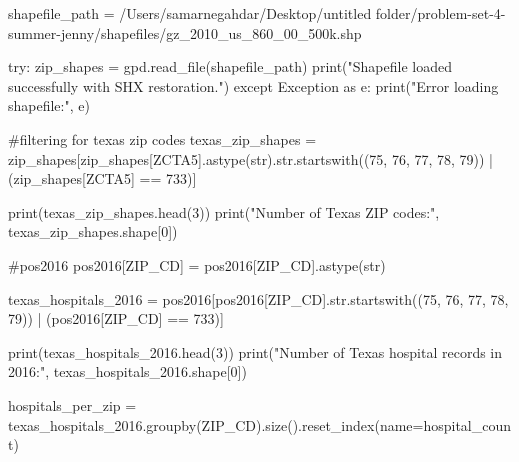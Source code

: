 \documentclass[
  letterpaper,
  DIV=11,
  numbers=noendperiod]{scrartcl}
\newenvironment{Shaded}{\begin{snugshade}}{\end{snugshade}}
\newcommand{\NormalTok}[1]{\textcolor[rgb]{0.00,0.23,0.31}{#1}}
\begin{document}
\begin{Shaded}
\begin{Highlighting}[]
\NormalTok{shapefile\_path = \textquotesingle{}/Users/samarnegahdar/Desktop/untitled folder/problem{-}set{-}4{-}summer{-}jenny/shapefiles/gz\_2010\_us\_860\_00\_500k.shp\textquotesingle{}}

\NormalTok{try:}
\NormalTok{    zip\_shapes = gpd.read\_file(shapefile\_path)}
\NormalTok{    print("Shapefile loaded successfully with SHX restoration.")}
\NormalTok{except Exception as e:}
\NormalTok{    print("Error loading shapefile:", e)}
\end{Highlighting}
\end{Shaded}

\begin{Shaded}
\begin{Highlighting}[]
\NormalTok{\#filtering for texas zip codes}
\NormalTok{texas\_zip\_shapes = zip\_shapes[zip\_shapes[\textquotesingle{}ZCTA5\textquotesingle{}].astype(str).str.startswith((\textquotesingle{}75\textquotesingle{}, \textquotesingle{}76\textquotesingle{}, \textquotesingle{}77\textquotesingle{}, \textquotesingle{}78\textquotesingle{}, \textquotesingle{}79\textquotesingle{})) | (zip\_shapes[\textquotesingle{}ZCTA5\textquotesingle{}] == \textquotesingle{}733\textquotesingle{})]}

\NormalTok{print(texas\_zip\_shapes.head(3))}
\NormalTok{print("Number of Texas ZIP codes:", texas\_zip\_shapes.shape[0])}
\end{Highlighting}
\end{Shaded}

\begin{Shaded}
\begin{Highlighting}[]
\NormalTok{\#pos2016 }
\NormalTok{pos2016[\textquotesingle{}ZIP\_CD\textquotesingle{}] = pos2016[\textquotesingle{}ZIP\_CD\textquotesingle{}].astype(str)}

\NormalTok{texas\_hospitals\_2016 = pos2016[pos2016[\textquotesingle{}ZIP\_CD\textquotesingle{}].str.startswith((\textquotesingle{}75\textquotesingle{}, \textquotesingle{}76\textquotesingle{}, \textquotesingle{}77\textquotesingle{}, \textquotesingle{}78\textquotesingle{}, \textquotesingle{}79\textquotesingle{})) | (pos2016[\textquotesingle{}ZIP\_CD\textquotesingle{}] == \textquotesingle{}733\textquotesingle{})]}

\NormalTok{print(texas\_hospitals\_2016.head(3))}
\NormalTok{print("Number of Texas hospital records in 2016:", texas\_hospitals\_2016.shape[0])}

\NormalTok{hospitals\_per\_zip = texas\_hospitals\_2016.groupby(\textquotesingle{}ZIP\_CD\textquotesingle{}).size().reset\_index(name=\textquotesingle{}hospital\_count\textquotesingle{})}
\end{Highlighting}
\end{Shaded}
\end{document}
